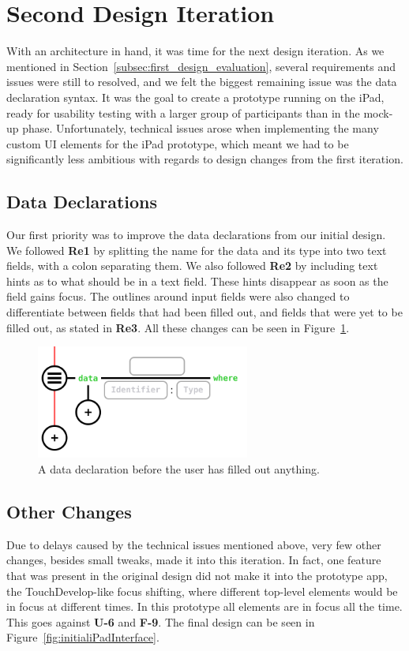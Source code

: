 \section{Second Design Iteration}
\label{sec:Implementation}

With an architecture in hand, it was time for the next design iteration.
As we mentioned in Section~\ref{subsec:first_design_evaluation}, several requirements and issues were still to resolved, and we felt the biggest remaining issue was the data declaration syntax.
It was the goal to create a prototype running on the iPad, ready for usability testing with a larger group of participants than in the mock-up phase.
Unfortunately, technical issues arose when implementing the many custom UI elements for the iPad prototype, which meant we had to be significantly less ambitious with regards to design changes from the first iteration.

\subsection{Data Declarations}
\label{subsec:second_data_declarations}
Our first priority was to improve the data declarations from our initial design. 
We followed \textbf{Re1} by splitting the name for the data and its type into two text fields, with a colon separating them. 
We also followed \textbf{Re2} by including text hints as to what should be in a text field.
These hints disappear as soon as the field gains focus.
The outlines around input fields were also changed to differentiate between fields that had been filled out, and fields that were yet to be filled out, as stated in \textbf{Re3}.
All these changes can be seen in Figure~\ref{fig:data_declaration}.

\begin{figure}
	\centering
		\includegraphics[width=70mm]{diagrams/data_declaration.png}
	\caption{A data declaration before the user has filled out anything.}
\label{fig:data_declaration}
\end{figure}

\subsection{Other Changes}
\label{subsec:other_changes}
Due to delays caused by the technical issues mentioned above, very few other changes, besides small tweaks, made it into this iteration.
In fact, one feature that was present in the original design did not make it into the prototype app, the TouchDevelop-like focus shifting, where different top-level elements would be in focus at different times. In this prototype all elements are in focus all the time. This goes against \textbf{U-6} and \textbf{F-9}. 
The final design can be seen in Figure~\ref{fig:initialiPadInterface}.

